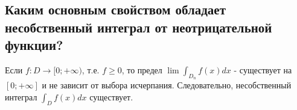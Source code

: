 
\subsection{Каким основным свойством обладает несобственный интеграл от неотрицательной функции?}

Если $f: D \rightarrow [0; +\infty)$, т.е. $f \geq 0$, то предел $\lim \int_{D_n} f(x) dx$ - существует на $[0; +\infty]$ и не зависит от выбора исчерпания. Следовательно, несобственный интеграл $\int_{D} f(x) dx$ существует.
